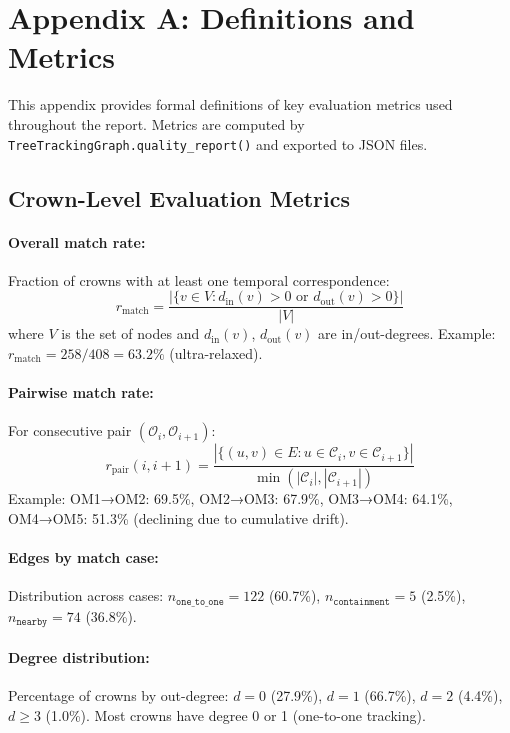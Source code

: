 \section{Appendix A: Definitions and Metrics}

This appendix provides formal definitions of key evaluation metrics used throughout the report. Metrics are computed by \texttt{TreeTrackingGraph.quality\_report()} and exported to JSON files.

\subsection{Crown-Level Evaluation Metrics}

\paragraph{Overall match rate:}
Fraction of crowns with at least one temporal correspondence:
\[
r_{\text{match}} = \frac{|\{v \in V : d_{\text{in}}(v) > 0 \text{ or } d_{\text{out}}(v) > 0\}|}{|V|}
\]
where $V$ is the set of nodes and $d_{\text{in}}(v)$, $d_{\text{out}}(v)$ are in/out-degrees. Example: $r_{\text{match}} = 258/408 = 63.2\%$ (ultra-relaxed).

\paragraph{Pairwise match rate:}
For consecutive pair $(\mathcal{O}_i, \mathcal{O}_{i+1})$:
\[
r_{\text{pair}}(i, i+1) = \frac{|\{(u,v) \in E : u \in \mathcal{C}_i, v \in \mathcal{C}_{i+1}\}|}{\min(|\mathcal{C}_i|, |\mathcal{C}_{i+1}|)}
\]
Example: OM1→OM2: 69.5\%, OM2→OM3: 67.9\%, OM3→OM4: 64.1\%, OM4→OM5: 51.3\% (declining due to cumulative drift).

\paragraph{Edges by match case:}
Distribution across cases: $n_{\texttt{one\_to\_one}} = 122$ (60.7\%), $n_{\texttt{containment}} = 5$ (2.5\%), $n_{\texttt{nearby}} = 74$ (36.8\%).

\paragraph{Degree distribution:}
Percentage of crowns by out-degree: $d=0$ (27.9\%), $d=1$ (66.7\%), $d=2$ (4.4\%), $d \geq 3$ (1.0\%). Most crowns have degree 0 or 1 (one-to-one tracking).

